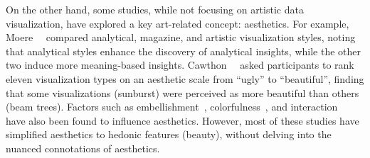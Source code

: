 
On the other hand, some studies, while not focusing on artistic data visualization, have explored a key art-related concept: aesthetics. 
For example, Moere~\etal~\cite{moere2012evaluating} compared analytical, magazine, and artistic visualization styles, noting that analytical styles enhance the discovery of analytical insights, while the other two induce more meaning-based insights. Cawthon~\etal~\cite{cawthon2007effect} asked participants to rank eleven visualization types on an aesthetic scale from ``ugly'' to ``beautiful'', finding that some visualizations (\eg sunburst) were perceived as more beautiful than others (\eg beam trees).
Factors such as embellishment~\cite{bateman2010useful}, colorfulness~\cite{harrison2015infographic}, and interaction~\cite{stoll2024investigating} have also been found to influence aesthetics. 
However, most of these studies have simplified aesthetics to hedonic features (\eg beauty), without delving into the nuanced connotations of aesthetics.

